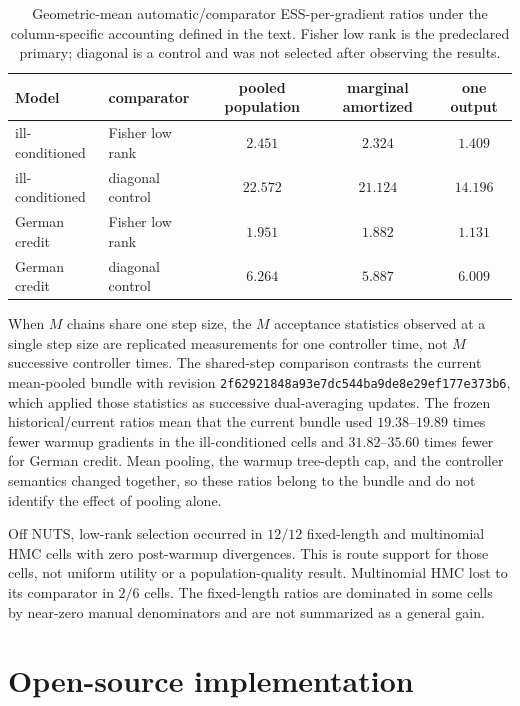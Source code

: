 \documentclass[11pt]{article}
\theoremstyle{plain}
\theoremstyle{definition}
\theoremstyle{remark}
\begin{document}
\begin{table}[H]\centering
\caption{Geometric-mean automatic/comparator ESS-per-gradient ratios under the
column-specific accounting defined in the text. Fisher low rank is the
predeclared primary; diagonal is a control and was not selected after observing
the results.}
\label{tab:eff}
\small
\begin{tabular}{@{}llccc@{}}
\toprule
Model & comparator & pooled population & marginal amortized & one output \\
\midrule
ill-conditioned & Fisher low rank & $2.451$ & $2.324$ & $1.409$ \\
ill-conditioned & diagonal control & $22.572$ & $21.124$ & $14.196$ \\
German credit & Fisher low rank & $1.951$ & $1.882$ & $1.131$ \\
German credit & diagonal control & $6.264$ & $5.887$ & $6.009$ \\
\bottomrule
\end{tabular}
\end{table}

When $M$ chains share one step size, the $M$ acceptance statistics observed at a
single step size are replicated measurements for one controller time, not $M$
successive controller times. The shared-step comparison contrasts the current
mean-pooled bundle with revision
\nolinkurl{2f62921848a93e7dc544ba9de8e29ef177e373b6}, which applied those
statistics as successive dual-averaging updates. The frozen
historical/current ratios mean that the current bundle used
$19.38$--$19.89$ times fewer warmup gradients in the ill-conditioned cells and
$31.82$--$35.60$ times fewer for German credit. Mean pooling, the warmup
tree-depth cap, and the controller semantics changed together, so these ratios
belong to the bundle and do not identify the effect of pooling alone.

Off NUTS, low-rank selection occurred in $12/12$ fixed-length and multinomial
HMC cells with zero post-warmup divergences. This is route support for those
cells, not uniform utility or a population-quality result. Multinomial HMC
lost to its comparator in $2/6$ cells. The fixed-length ratios are dominated
in some cells by near-zero manual denominators and are not summarized as a
general gain.

\section{Open-source implementation}\label{sec:impl}
\end{document}
